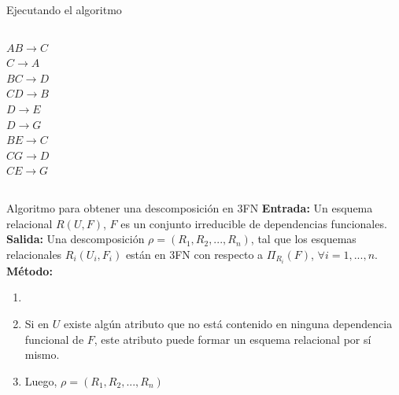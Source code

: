 \begin{frame}{Ejecutando el algoritmo}
\begin{columns}[T]
\begin{column}{0.25\linewidth}
{            $AB \to C$\\
            $C \to A$\\
            $BC \to D$\\
            $CD \to B$\\
            $D \to E$\\
            $D \to G$\\
            $BE \to C$\\
            $CG \to D$\\
            $CE \to G$
        }
        \end{column}

    \end{columns}
    \vspace{5mm}

    \centering

    
\end{frame}

\begin{frame}{Algoritmo para obtener una descomposici\'on en 3FN}
    \textbf{Entrada:} Un esquema relacional $R(U,F)$, $F$ es un conjunto irreducible de dependencias funcionales.\\
    \textbf{Salida:} Una descomposici\'on $\rho = (R_1,R_2,...,R_n)$, tal que
    los esquemas relacionales $R_i(U_i,F_i)$ est\'an en 3FN con respecto
    a $\Pi_{R_i}(F)$, $\forall i = 1,...,n$.\\

    \pause
    \textbf{M\'etodo:}\begin{enumerate}
        \item<2-> 
        \item<4-> Si en $U$ existe alg\'un atributo que no est\'a contenido en ninguna dependencia
        funcional de $F$, este atributo puede formar un esquema relacional por s\'i mismo.
        \item<5-> Luego, $\rho = (R_1,R_2,...,R_n)$
    \end{enumerate}
\end{frame}

